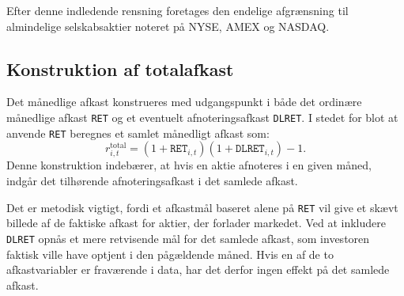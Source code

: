 \documentclass[../main.tex]{subfiles}
\begin{document}
Efter denne indledende rensning foretages den endelige afgrænsning til almindelige selskabsaktier noteret på NYSE, AMEX og NASDAQ. 

\subsection{Konstruktion af totalafkast}

Det månedlige afkast konstrueres med udgangspunkt i både det ordinære månedlige afkast \texttt{RET} og et eventuelt afnoteringsafkast \texttt{DLRET}. I stedet for blot at anvende \texttt{RET} beregnes et samlet månedligt afkast som:
\begin{equation}
    r_{i,t}^{\text{total}} = (1+\texttt{RET}_{i,t})(1+\texttt{DLRET}_{i,t}) - 1.
\end{equation}
Denne konstruktion indebærer, at hvis en aktie afnoteres i en given måned, indgår det tilhørende afnoteringsafkast i det samlede afkast.

Det er metodisk vigtigt, fordi et afkastmål baseret alene på \texttt{RET} vil give et skævt billede af de faktiske afkast for aktier, der forlader markedet. Ved at inkludere \texttt{DLRET} opnås et mere retvisende mål for det samlede afkast, som investoren faktisk ville have optjent i den pågældende måned. Hvis en af de to afkastvariabler er fraværende i data, har det derfor ingen effekt på det samlede afkast.
\end{document}
